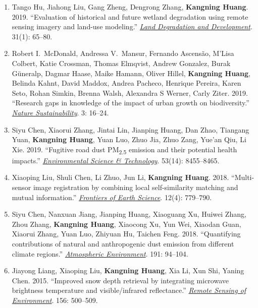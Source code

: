 \documentclass[11pt,letterpaper]{article}
\begin{document}
\begin{enumerate}
  \item Tango Hu, Jiahong Liu, Gang Zheng, Dengrong Zhang, \textbf{Kangning Huang}. 2019. ``Evaluation of historical and future wetland degradation using remote sensing imagery and land-use modeling.'' \href{https://onlinelibrary.wiley.com/doi/abs/10.1002/ldr.3429}{\textit{Land Degradation and Development}}. 31(1): 65--80.

  \item Robert I.\ McDonald, Andressa V.\ Mansur, Fernando Ascens\~{a}o, M'Lisa Colbert, Katie Crossman, Thomas Elmqvist, Andrew Gonzalez, Burak G\"{u}neralp, Dagmar Haase, Maike Hamann, Oliver Hillel, \textbf{Kangning Huang}, Belinda Kahnt, David Maddox, Andrea Pacheco, Henrique Pereira, Karen Seto, Rohan Simkin, Brenna Walsh, Alexandra S Werner, Carly Ziter. 2019. ``Research gaps in knowledge of the impact of urban growth on biodiversity.'' \href{https://www.nature.com/articles/s41893-019-0436-6}{\textit{Nature Sustainability}}. 3: 16--24.

  \item Siyu Chen, Xiaorui Zhang, Jintai Lin, Jianping Huang, Dan Zhao, Tiangang Yuan, \textbf{Kangning Huang}, Yuan Luo, Zhuo Jia, Zhuo Zang, Yue'an Qiu, Li Xie. 2019. ``Fugitive road dust PM\textsubscript{2.5} emission and their potential health impacts.'' \href{https://pubs.acs.org/doi/10.1021/acs.est.9b00666}{\textit{Environmental Science \& Technology}}. 53(14): 8455--8465.

  \item Xiaoping Liu, Shuli Chen, Li Zhuo, Jun Li, \textbf{Kangning Huang}. 2018. ``Multi-sensor image registration by combining local self-similarity matching and mutual information.'' \href{https://link.springer.com/article/10.1007\%2Fs11707-018-0717-9}{\textit{Frontiers of Earth Science}}. 12(4): 779--790.

  \item Siyu Chen, Nanxuan Jiang, Jianping Huang, Xiaoguang Xu, Huiwei Zhang, Zhou Zhang, \textbf{Kangning Huang}, Xiaocong Xu, Yun Wei, Xiaodan Guan, Xiaorui Zhang, Yuan Luo, Zhiyuan Hu, Taichen Feng. 2018. ``Quantifying contributions of natural and anthropogenic dust emission from different climate regions.'' \href{https://badge.dimensions.ai/details/id/pub.1105977845}{\textit{Atmospheric Environment}}. 191: 94--104.

  \item Jiayong Liang, Xiaoping Liu, \textbf{Kangning Huang}, Xia Li, Xun Shi, Yaning Chen. 2015. ``Improved snow depth retrieval by integrating microwave brightness temperature and visible/infrared reflectance.'' \href{https://badge.dimensions.ai/details/doi/10.1016/j.rse.2014.10.016}{\textit{Remote Sensing of Environment}}. 156: 500--509.


\end{enumerate}
\end{document}
